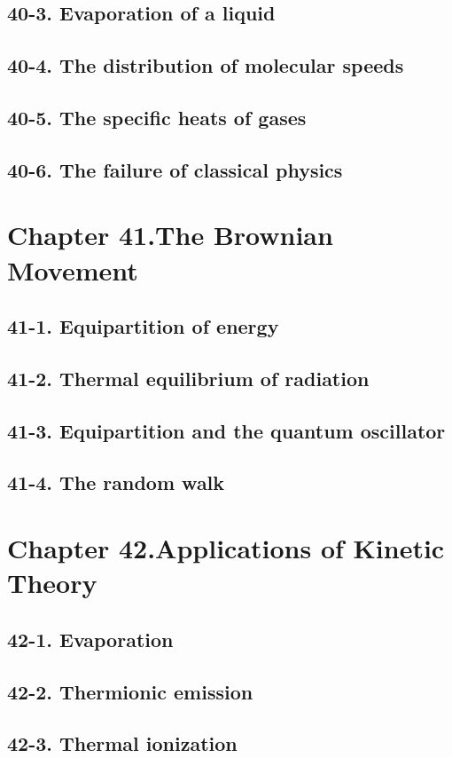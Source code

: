 \documentclass{article}
\begin{document}
\subsection{40-3. Evaporation of a liquid}
\subsection{40-4. The distribution of molecular speeds}
\subsection{40-5. The specific heats of gases}
\subsection{40-6. The failure of classical physics}
\section{Chapter 41.The Brownian Movement}
\subsection{41-1. Equipartition of energy}
\subsection{41-2. Thermal equilibrium of radiation}
\subsection{41-3. Equipartition and the quantum oscillator}
\subsection{41-4. The random walk}
\section{Chapter 42.Applications of Kinetic Theory}
\subsection{42-1. Evaporation}
\subsection{42-2. Thermionic emission}
\subsection{42-3. Thermal ionization}
\end{document}
